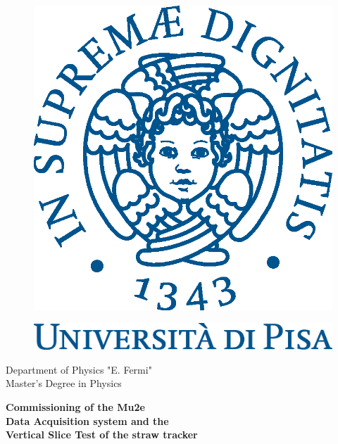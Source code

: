 \begin{titlepage}
\begin{figure}[!htb]
    \centering
    \includegraphics[keepaspectratio=true,scale=0.5]{figures/eps/cherubinFrontespizio.eps}
\end{figure}
\begin{figure}[!htb]
    \centering
    \includegraphics[keepaspectratio=true,scale=0.5]{figures/eps/logo_pant541.eps}
\end{figure}

\begin{center}
     \Large{Department of Physics "E. Fermi"}
    \vspace{5mm}
    \\ \Large{Master's Degree in Physics}
\end{center}

\vspace{15mm}
\begin{center}
    {\LARGE{\bf Commissioning of the Mu2e\\ \vspace{3mm} Data Acquisition system and the\\ \vspace{5mm} Vertical Slice Test of the straw tracker}}
    

\end{center}
\end{titlepage}
